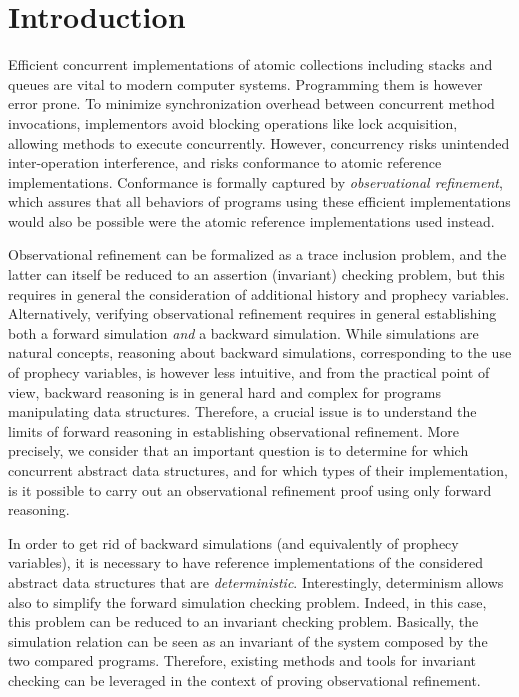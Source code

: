 \section{Introduction}

Efficient concurrent implementations of atomic collections including stacks and queues are vital to modern computer systems. Programming them is however error prone. To minimize synchronization overhead between concurrent method invocations, implementors avoid blocking operations like lock acquisition, allowing methods to execute concurrently. However, concurrency risks unintended inter-operation interference, and risks conformance to atomic reference implementations. Conformance is formally captured by \emph{observational refinement}, which assures that all behaviors of programs
using these efficient implementations would also be possible were the atomic reference implementations used instead.

Observational refinement can be formalized as a trace inclusion problem, and the latter can itself be reduced to an assertion (invariant) checking problem, but this requires in general the consideration of additional history and prophecy variables. Alternatively, verifying observational refinement requires in general establishing both a forward simulation {\em and} a backward simulation. While simulations are natural concepts, reasoning about backward simulations, corresponding to the use of prophecy variables, is however less intuitive, and from the practical point of view, backward reasoning is in general hard and complex for programs manipulating data structures. Therefore, a crucial issue is to understand the limits of forward reasoning in establishing observational refinement. More precisely, we consider that an important question is to determine for which concurrent abstract data structures, and for which types of their implementation, is it possible to carry out an observational refinement proof using only forward reasoning.

In order to get rid of backward simulations (and equivalently of prophecy variables), it is necessary to have reference implementations of the considered abstract data structures that are {\em deterministic}. Interestingly, determinism allows also to simplify the forward simulation checking problem. Indeed, in this case, this problem can be reduced to an invariant checking problem. Basically, the simulation relation can be seen as an invariant of the system composed by the two compared programs. Therefore, existing methods and tools for invariant checking can be leveraged in the context of proving observational refinement. 

